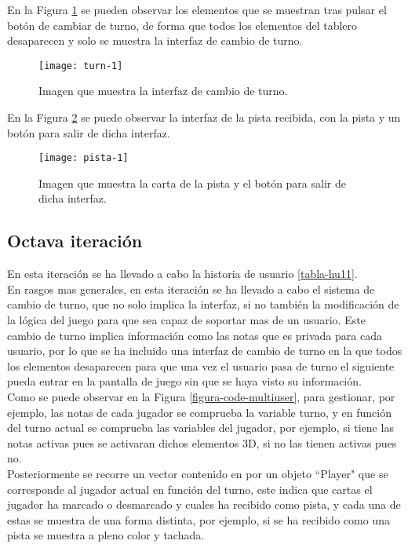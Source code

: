En la Figura \ref{figura-turn-1} se pueden observar los elementos que se muestran tras pulsar el botón de cambiar de turno, de forma que todos los elementos del tablero desaparecen y solo se muestra la interfaz de cambio de turno.

\begin{figure}[h]
  \centering
  \texttt{[image: turn-1]}
  \caption{Imagen que muestra la interfaz de cambio de turno.}
  \label{figura-turn-1}
\end{figure}

\newpage

En la Figura \ref{figura-pista-1} se puede observar la interfaz de la pista recibida, con la pista y un botón para salir de dicha interfaz.

\begin{figure}[h]
  \centering
  \texttt{[image: pista-1]}
  \caption{Imagen que muestra la carta de la pista y el botón para salir de dicha interfaz.}
  \label{figura-pista-1}
\end{figure}


\subsection{Octava iteración}
En esta iteración se ha llevado a cabo la historia de usuario \ref{tabla-hu11}.\\

En rasgos mas generales, en esta iteración se ha llevado a cabo el sistema de cambio de turno, que no solo implica la interfaz, si no también la modificación de la lógica del juego para que sea capaz de soportar mas de un usuario. Este cambio de turno implica información como las notas que es privada para cada usuario, por lo que se ha incluido una interfaz de cambio de turno en la que todos los elementos desaparecen para que una vez el usuario pasa de turno el siguiente pueda entrar en la pantalla de juego sin que se haya visto su información.\\

Como se puede observar en la Figura \ref{figura-code-multiuser}, para gestionar, por ejemplo, las notas de cada jugador se comprueba la variable turno, y en función del turno actual se comprueba las variables del jugador, por ejemplo, si tiene las notas activas pues se activaran dichos elementos 3D, si no las tienen activas pues no.\\

Posteriormente se recorre un vector contenido en por un objeto ``Player" que se corresponde al jugador actual en función del turno, este indica que cartas el jugador ha marcado o desmarcado y cuales ha recibido como pista, y cada una de estas se muestra de una forma distinta, por ejemplo, si se ha recibido como una pista se muestra a pleno color y tachada.\\

